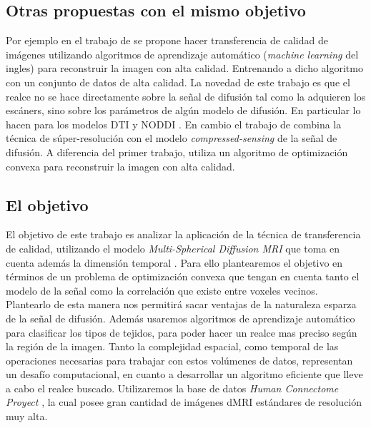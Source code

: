 \documentclass[a4paper,10pt]{article}
\begin{document}
\subsection{Otras propuestas con el mismo objetivo}
Por ejemplo en el trabajo de \citet{Alexander2014} se propone hacer transferencia de 
calidad de imágenes utilizando algoritmos de aprendizaje automático 
(\textit{machine learning} del ingles) para reconstruir la imagen con alta 
calidad. Entrenando a dicho algoritmo con un conjunto de datos de alta 
calidad. La novedad de este trabajo es que el realce no se hace directamente 
sobre la señal de difusión tal como la adquieren los escáners, sino sobre los 
parámetros de algún modelo de difusión. En particular lo hacen para los modelos DTI y NODDI 
\citep{Zhang2012}. 
En cambio el trabajo de \citet{Ning2016} combina la 
t\'ecnica de súper-resolución con el modelo \textit{compressed-sensing} \citep{Naidoo2015} de la señal de difusión. A 
diferencia del primer trabajo, utiliza un algoritmo de 
optimización convexa para reconstruir la imagen con alta calidad.

\subsection{El objetivo}
El objetivo de este trabajo es analizar la aplicación de la técnica de 
transferencia de calidad, utilizando el modelo \textit{Multi-Spherical Diffusion MRI} que toma en cuenta además 
la dimensión temporal \citep{Fick}. Para ello plantearemos el objetivo en términos de un problema 
de optimización convexa que tengan en cuenta tanto el modelo de la se\~nal como la correlaci\'on 
que existe entre voxeles vecinos. Plantearlo de esta manera nos permitirá sacar ventajas de la naturaleza esparza 
de la señal de difusión. Además usaremos algoritmos de aprendizaje automático para clasificar los tipos de tejidos, 
para poder hacer un realce mas preciso según la región de la imagen. Tanto la complejidad espacial, como temporal de 
las operaciones necesarias para trabajar con estos vol\'umenes de datos, representan un desafío 
computacional, en cuanto a desarrollar un algoritmo eficiente que lleve a cabo el realce buscado. 
Utilizaremos la base de datos \textit{Human Connectome Proyect} \citep{Barch2013}, la cual posee 
gran cantidad de imágenes dMRI estándares de resolución muy alta.



\clearpage


\end{document}
